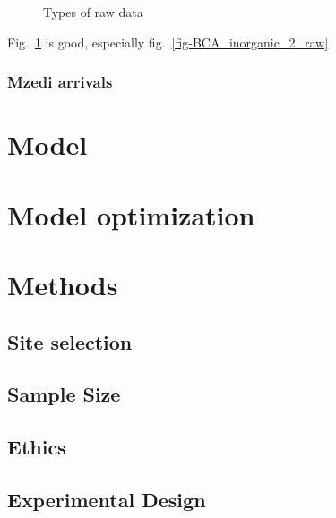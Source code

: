 \documentclass[
  letterpaper,
  DIV=11,
  numbers=noendperiod]{scrartcl}
\begin{document}
\begin{figure}
\begin{minipage}[t]{0.50\linewidth}
{{}

}

\end{minipage}%

\caption{\label{fig-raw}Types of raw data}

\end{figure}

Fig.~\ref{fig-raw} is good, especially
fig.~\ref{fig-BCA_inorganic_2_raw}

\hypertarget{mzedi-arrivals}{%
\subsubsection{Mzedi arrivals}\label{mzedi-arrivals}}

\hypertarget{model}{%
\section{Model}\label{model}}

\hypertarget{model-optimization}{%
\section{Model optimization}\label{model-optimization}}

\hypertarget{methods}{%
\section{Methods}\label{methods}}

\hypertarget{site-selection}{%
\subsection{Site selection}\label{site-selection}}

\hypertarget{sample-size}{%
\subsection{Sample Size}\label{sample-size}}

\hypertarget{ethics}{%
\subsection{Ethics}\label{ethics}}

\hypertarget{experimental-design}{%
\subsection{Experimental Design}\label{experimental-design}}
\end{document}
